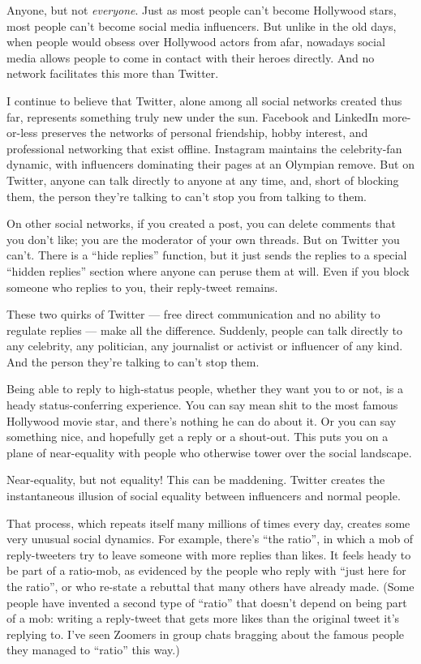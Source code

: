 \documentclass[
]{book}
\begin{document}
Anyone, but not \emph{everyone}. Just as most people can't become Hollywood stars, most people can't become social media influencers. But unlike in the old days, when people would obsess over Hollywood actors from afar, nowadays social media allows people to come in contact with their heroes directly. And no network facilitates this more than Twitter.

I continue to believe that Twitter, alone among all social networks created thus far, represents something truly new under the sun. Facebook and LinkedIn more-or-less preserves the networks of personal friendship, hobby interest, and professional networking that exist offline. Instagram maintains the celebrity-fan dynamic, with influencers dominating their pages at an Olympian remove. But on Twitter, anyone can talk directly to anyone at any time, and, short of blocking them, the person they're talking to can't stop you from talking to them.

On other social networks, if you created a post, you can delete comments that you don't like; you are the moderator of your own threads. But on Twitter you can't. There is a ``hide replies'' function, but it just sends the replies to a special ``hidden replies'' section where anyone can peruse them at will. Even if you block someone who replies to you, their reply-tweet remains.

These two quirks of Twitter --- free direct communication and no ability to regulate replies --- make all the difference. Suddenly, people can talk directly to any celebrity, any politician, any journalist or activist or influencer of any kind. And the person they're talking to can't stop them.

Being able to reply to high-status people, whether they want you to or not, is a heady status-conferring experience. You can say mean shit to the most famous Hollywood movie star, and there's nothing he can do about it. Or you can say something nice, and hopefully get a reply or a shout-out. This puts you on a plane of near-equality with people who otherwise tower over the social landscape.

Near-equality, but not equality!
This can be maddening. Twitter creates the instantaneous illusion of social equality between influencers and normal people.

That process, which repeats itself many millions of times every day, creates some very unusual social dynamics. For example, there's ``the ratio'', in which a mob of reply-tweeters try to leave someone with more replies than likes. It feels heady to be part of a ratio-mob, as evidenced by the people who reply with ``just here for the ratio'', or who re-state a rebuttal that many others have already made. (Some people have invented a second type of ``ratio'' that doesn't depend on being part of a mob: writing a reply-tweet that gets more likes than the original tweet it's replying to. I've seen Zoomers in group chats bragging about the famous people they managed to ``ratio'' this way.)
\end{document}
